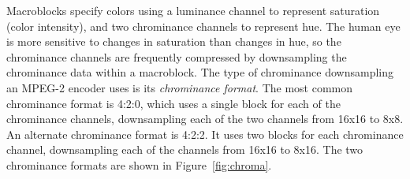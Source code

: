 
Macroblocks specify colors using a luminance channel to represent
saturation (color intensity), and two chrominance channels to
represent hue. The human eye is more sensitive to changes in
saturation than changes in hue, so the chrominance channels are
frequently compressed by downsampling the chrominance data within a
macroblock. The type of chrominance downsampling an MPEG-2 encoder
uses is its {\it chrominance format}. The most common chrominance
format is 4:2:0, which uses a single block for each of the chrominance
channels, downsampling each of the two channels from 16x16 to 8x8.  An
alternate chrominance format is 4:2:2. It uses two blocks for each
chrominance channel, downsampling each of the channels from 16x16 to
8x16. The two chrominance formats are shown in Figure~\ref{fig:chroma}.

